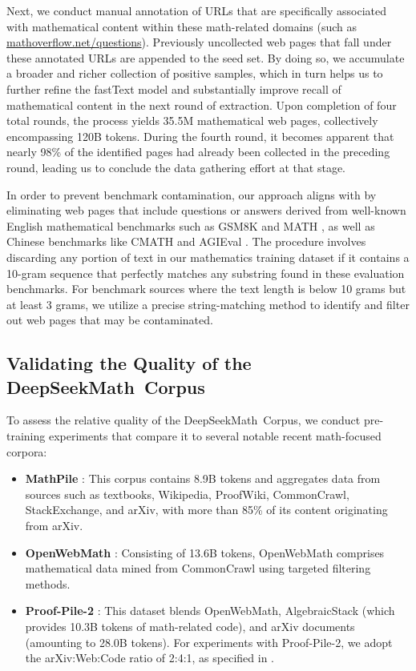 \begin{itemize}[topsep=0pt]
Next, we conduct manual annotation of URLs that are specifically associated with mathematical content within these math-related domains (such as \url{mathoverflow.net/questions}). Previously uncollected web pages that fall under these annotated URLs are appended to the seed set. By doing so, we accumulate a broader and richer collection of positive samples, which in turn helps us to further refine the fastText model and substantially improve recall of mathematical content in the next round of extraction. Upon completion of four total rounds, the process yields 35.5M mathematical web pages, collectively encompassing 120B tokens. During the fourth round, it becomes apparent that nearly 98\% of the identified pages had already been collected in the preceding round, leading us to conclude the data gathering effort at that stage.

In order to prevent benchmark contamination, our approach aligns with \cite{deepseek-coder} by eliminating web pages that include questions or answers derived from well-known English mathematical benchmarks such as GSM8K \citep{gsm8k} and MATH \citep{MATH}, as well as Chinese benchmarks like CMATH \citep{wei2023cmath} and AGIEval \citep{agieval}. The procedure involves discarding any portion of text in our mathematics training dataset if it contains a 10-gram sequence that perfectly matches any substring found in these evaluation benchmarks. For benchmark sources where the text length is below 10 grams but at least 3 grams, we utilize a precise string-matching method to identify and filter out web pages that may be contaminated.

\subsection{Validating the Quality of the DeepSeekMath~Corpus}

To assess the relative quality of the DeepSeekMath~Corpus, we conduct pre-training experiments that compare it to several notable recent math-focused corpora:

\begin{itemize}[topsep=0pt]
    \item \textbf{MathPile} \citep{mathpile}: This corpus contains 8.9B tokens and aggregates data from sources such as textbooks, Wikipedia, ProofWiki, CommonCrawl, StackExchange, and arXiv, with more than 85\% of its content originating from arXiv.
    \item \textbf{OpenWebMath} \citep{openwebmath}: Consisting of 13.6B tokens, OpenWebMath comprises mathematical data mined from CommonCrawl using targeted filtering methods.
    \item \textbf{Proof-Pile-2} \citep{llemma}: This dataset blends OpenWebMath, AlgebraicStack (which provides 10.3B tokens of math-related code), and arXiv documents (amounting to 28.0B tokens). For experiments with Proof-Pile-2, we adopt the arXiv:Web:Code ratio of 2:4:1, as specified in \cite{llemma}.
\end{itemize}


\end{itemize}
